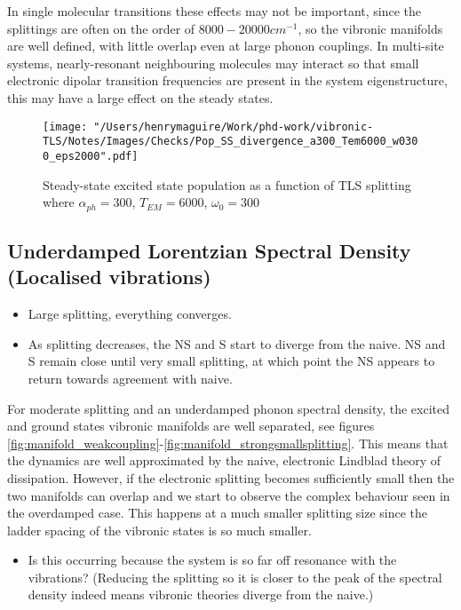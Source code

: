 \documentclass[]{article}
\begin{document}
In single molecular transitions these effects may not be important, since the splittings are often on the order of $8000-20000 cm^{-1}$, so the vibronic manifolds are well defined, with little overlap even at large phonon couplings. In multi-site systems, nearly-resonant neighbouring molecules may interact so that small electronic dipolar transition frequencies are present in the system eigenstructure, this may have a large effect on the steady states.

\begin{figure}[h]
	\centering
	\texttt{[image: "/Users/henrymaguire/Work/phd-work/vibronic-TLS/Notes/Images/Checks/Pop\_SS\_divergence\_a300\_Tem6000\_w0300\_eps2000".pdf]}
	\caption{Steady-state excited state population as a function of TLS splitting where $\alpha_{ph}=300$, $T_{EM} =6000$, $\omega_0 = 300$}
	\label{fig:steadyStatevsSplitting}
\end{figure}


\subsection{Underdamped Lorentzian Spectral Density (Localised vibrations)}
\begin{itemize}
	\item Large splitting, everything converges.
	\item As splitting decreases, the NS and S start to diverge from the naive. NS and S remain close until very small splitting, at which point the NS appears to return towards agreement with naive.
\end{itemize}

For moderate splitting and an underdamped phonon spectral density, the excited and ground states vibronic manifolds are well separated, see figures \ref{fig:manifold_weakcoupling}-\ref{fig:manifold_strongsmallsplitting}. This means that the dynamics are well approximated by the naive, electronic Lindblad theory of dissipation. However, if the electronic splitting becomes sufficiently small then the two manifolds can overlap and we start to observe the complex behaviour seen in the overdamped case. This happens at a much smaller splitting size since the ladder spacing of the vibronic states is so much smaller.

\begin{itemize}
	\item Is this occurring because the system is so far off resonance with the vibrations? (Reducing the splitting so it is closer to the peak of the spectral density indeed means vibronic theories diverge from the naive.)
\end{itemize}
\end{document}
